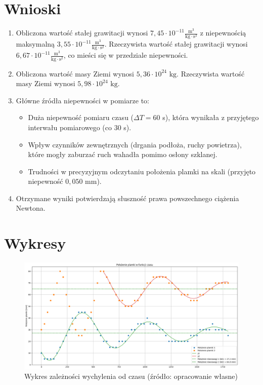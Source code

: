 \documentclass[a4paper,12pt]{article}
\begin{document}
\section{Wnioski}

\begin{enumerate}
    \item Obliczona wartość stałej grawitacji wynosi $7{,}45 \cdot 10^{-11} \frac{\text{m}^3}{\text{kg} \cdot \text{s}^2}$ z niepewnością maksymalną $3{,}55 \cdot 10^{-11} \frac{\text{m}^3}{\text{kg} \cdot \text{s}^2}$. Rzeczywista wartość stałej grawitacji wynosi $6{,}67 \cdot 10^{-11} \frac{\text{m}^3}{\text{kg} \cdot \text{s}^2}$, co mieści się w przedziale niepewności.

    \item Obliczona wartość masy Ziemi wynosi $5{,}36 \cdot 10^{24} \text{ kg}$. Rzeczywista wartość masy Ziemi wynosi $5{,}98 \cdot 10^{24} \text{ kg}$.

    \item Główne źródła niepewności w pomiarze to:
          \begin{itemize}
              \item Duża niepewność pomiaru czasu ($\Delta T = 60$ s), która wynikała z przyjętego interwału pomiarowego (co 30 s).
              \item Wpływ czynników zewnętrznych (drgania podłoża, ruchy powietrza), które mogły zaburzać ruch wahadła pomimo osłony szklanej.
              \item Trudności w precyzyjnym odczytaniu położenia plamki na skali (przyjęto niepewność $0{,}050$ mm).
          \end{itemize}

    \item Otrzymane wyniki potwierdzają słuszność prawa powszechnego ciążenia Newtona.
\end{enumerate}
\newpage

\section{Wykresy}

\begin{figure}[H]
    \centering
    \includegraphics[width=0.9\textheight,angle=90]{wykres.png}
    \caption{Wykres zależności wychylenia od czasu (źródło: opracowanie własne)}
    \label{fig:wykres}
\end{figure}




\end{document}
